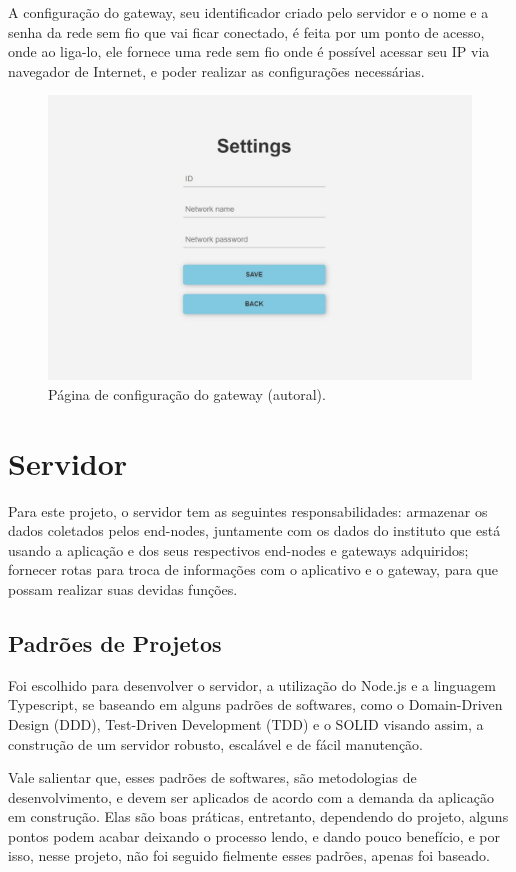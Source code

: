 A configuração do gateway, seu identificador criado pelo servidor e o nome e a senha da rede sem fio que vai ficar conectado, é feita por um ponto de acesso, onde ao liga-lo, ele fornece uma rede sem fio onde é possível acessar seu IP via navegador de Internet, e poder realizar as configurações necessárias.

\begin{figure}[H]
  \centering
  \includegraphics[width=.80\textwidth]{assets/gateway-ap.png} 
  \caption{Página de configuração do gateway (autoral).}
  \label{fig:gateway-ap} 
\end{figure}

\section{Servidor}
\label{metod:servidor}
Para este projeto, o servidor tem as seguintes responsabilidades: armazenar os dados coletados pelos end-nodes, juntamente com os dados do instituto que está usando a aplicação e dos seus respectivos end-nodes e gateways adquiridos; fornecer rotas para troca de informações com o aplicativo e o gateway, para que possam realizar suas devidas funções.

\subsection{Padrões de Projetos}
\label{metod:servidor:padroes}
Foi escolhido para desenvolver o servidor, a utilização do Node.js e a linguagem Typescript, se baseando em alguns padrões de softwares, como o Domain-Driven Design (DDD), Test-Driven Development (TDD) e o SOLID visando assim, a construção de um servidor robusto, escalável e de fácil manutenção.

Vale salientar que, esses padrões de softwares, são metodologias de desenvolvimento, e devem ser aplicados de acordo com a demanda da aplicação em construção. Elas são boas práticas, entretanto, dependendo do projeto, alguns pontos podem acabar deixando o processo lendo, e dando pouco benefício, e por isso, nesse projeto, não foi seguido fielmente esses padrões, apenas foi baseado.

